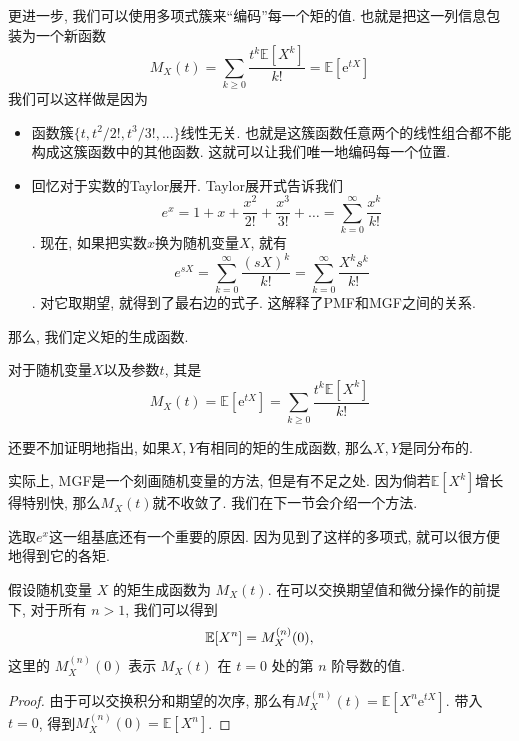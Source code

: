 \documentclass{ctexart}
\begin{document}
更进一步, 我们可以使用多项式簇来``编码''每一个矩的值. 也就是把这一列信息包装为一个新函数
$$
M_X(t)=\sum_{k \geq 0} \frac{t^k \mathbb{E}\left[X^k\right]}{k!}=\mathbb{E}\left[\mathrm{e}^{t X}\right]
$$
我们可以这样做是因为
\begin{itemize}
    \item 函数簇$\{ t, t^2/2!, t^3/3!, ... \}$线性无关. 也就是这簇函数任意两个的线性组合都不能构成这簇函数中的其他函数. 这就可以让我们唯一地编码每一个位置.
    \item 回忆对于实数的Taylor展开. Taylor展开式告诉我们$$e^x=1+x+\frac{x^2}{2!}+\frac{x^3}{3!}+\ldots=\sum_{k=0}^{\infty} \frac{x^k}{k!}$$. 现在, 如果把实数$x$换为随机变量$X$, 就有$$e^{s X}=\sum_{k=0}^{\infty} \frac{(s X)^k}{k!}=\sum_{k=0}^{\infty} \frac{X^k s^k}{k!}$$. 对它取期望, 就得到了最右边的式子. 这解释了PMF和MGF之间的关系.
\end{itemize}



那么, 我们定义矩的生成函数.

\begin{definition}[矩的生成函数]
    对于随机变量$X$以及参数$t$, 其是
    $$
M_X(t)=\mathbb{E}\left[\mathrm{e}^{t X}\right]=\sum_{k \geq 0} \frac{t^k \mathbb{E}\left[X^k\right]}{k!}
$$

\end{definition}

还要不加证明地指出, 如果$X, Y$有相同的矩的生成函数, 那么$X, Y$是同分布的. 

实际上, MGF是一个刻画随机变量的方法, 但是有不足之处. 因为倘若$\mathbb{E}\left[X^k\right]$增长得特别快, 那么$M_X(t)$就不收敛了. 我们在下一节会介绍一个方法. 

选取$e^x$这一组基底还有一个重要的原因. 因为见到了这样的多项式, 就可以很方便地得到它的各矩. 

\begin{theorem}
    假设随机变量 $X$ 的矩生成函数为 $M_X(t)$. 
在可以交换期望值和微分操作的前提下, 对于所有 $n > 1$, 我们可以得到
$$\mathbb E[X^n] = M_X^{(n)}(0),$$这里的 $M_X^{(n)}(0)$ 表示 $M_X(t)$ 在 $t = 0$ 处的第 $n$ 阶导数的值. 

\end{theorem}
\begin{proof}
    由于可以交换积分和期望的次序, 那么有$M_X^{(n)}(t)=\mathbb{E}\left[X^n \mathrm{e}^{t X}\right]$. 带入$t=0$, 得到$M_X^{(n)}(0)=\mathbb{E}\left[X^n\right]$. 
\end{proof}
\end{document}
